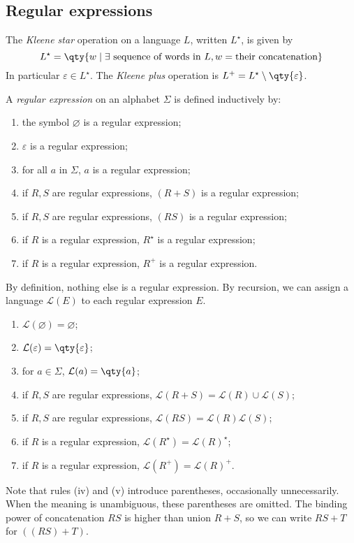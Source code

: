 \subsection{Regular expressions}
\begin{definition}
	The \emph{Kleene star} operation on a language \( L \), written \( L^\star \), is given by
	\[ L^\star = \qty{w \mid \exists \text{ sequence of words in } L, w = \text{their concatenation}} \]
	In particular \( \varepsilon \in L^\star \).
	The \emph{Kleene plus} operation is \( L^+ = L^\star \setminus \qty{\varepsilon} \).
\end{definition}
\begin{definition}
	A \emph{regular expression} on an alphabet \( \Sigma \) is defined inductively by:
	\begin{enumerate}
		\item the symbol \( \varnothing \) is a regular expression;
		\item \( \varepsilon \) is a regular expression;
		\item for all \( a \) in \( \Sigma \), \( a \) is a regular expression;
		\item if \( R, S \) are regular expressions, \( (R + S) \) is a regular expression;
		\item if \( R, S \) are regular expressions, \( (R S) \) is a regular expression;
		\item if \( R \) is a regular expression, \( R^\star \) is a regular expression;
		\item if \( R \) is a regular expression, \( R^+ \) is a regular expression.
	\end{enumerate}
	By definition, nothing else is a regular expression.
	By recursion, we can assign a language \( \mathcal L(E) \) to each regular expression \( E \).
	\begin{enumerate}
		\item \( \mathcal L(\varnothing) = \varnothing \);
		\item \( \mathcal L(\varepsilon) = \qty{\varepsilon} \);
		\item for \( a \in \Sigma \), \( \mathcal L(a) = \qty{a} \);
		\item if \( R, S \) are regular expressions, \( \mathcal L(R + S) = \mathcal L(R) \cup \mathcal L(S) \);
		\item if \( R, S \) are regular expressions, \( \mathcal L(R S) = \mathcal L(R) \mathcal L(S) \);
		\item if \( R \) is a regular expression, \( \mathcal L(R^\star) = \mathcal L(R)^\star \);
		\item if \( R \) is a regular expression, \( \mathcal L(R^+) = \mathcal L(R)^+ \).
	\end{enumerate}
\end{definition}
Note that rules (iv) and (v) introduce parentheses, occasionally unnecessarily.
When the meaning is unambiguous, these parentheses are omitted.
The binding power of concatenation \( RS \) is higher than union \( R + S \), so we can write \( RS + T \) for \( ((RS) + T) \).

